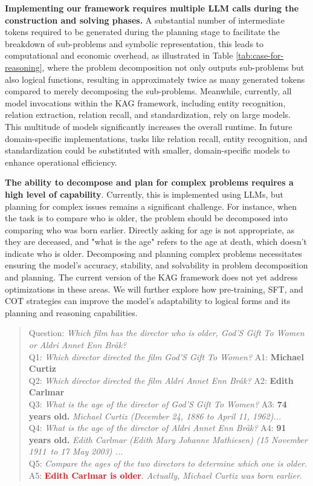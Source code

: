 \documentclass{article}
\begin{document}
\textbf{Implementing our framework requires multiple LLM calls during the construction and solving phases.} A substantial number of intermediate tokens required to be generated during the planning stage to facilitate the breakdown of sub-problems and symbolic representation, this leads to computational and economic overhead, as illustrated in Table \ref{tab:case-for-reasoning}, where the problem decomposition not only outputs sub-problems but also logical functions, resulting in approximately twice as many generated tokens compared to merely decomposing the sub-problems. Meanwhile, currently, all model invocations within the KAG framework, including entity recognition, relation extraction, relation recall, and standardization, rely on large models. This multitude of models significantly increases the overall runtime. In future domain-specific implementations, tasks like relation recall, entity recognition, and standardization could be substituted with smaller, domain-specific models to enhance operational efficiency.

\textbf{The ability to decompose and plan for complex problems requires a high level of capability}. Currently, this is implemented using LLMs, but planning for complex issues remains a significant challenge. For instance, when the task is to compare who is older, the problem should be decomposed into comparing who was born earlier. Directly asking for age is not appropriate, as they are deceased, and \text"what is the age" refers to the age at death, which doesn't indicate who is older. 
Decomposing and planning complex problems necessitates ensuring the model's accuracy, stability, and solvability in problem decomposition and planning. The current version of the KAG framework does not yet address optimizations in these areas.
We will further explore how pre-training, SFT, and COT strategies can improve the model's adaptability to logical forms and its planning and reasoning capabilities.

\begin{quote}
\small
    Question: \textit{Which film has the director who is older, God'S Gift To Women or Aldri Annet Enn Bråk?} \\
    Q1: \textit{Which director directed the film God'S Gift To Women?}  A1: \textbf{Michael Curtiz} \\
    Q2: \textit{Which director directed the film Aldri Annet Enn Bråk?}  A2: \textbf{Edith Carlmar} \\
    Q3: \textit{What is the age of the director of God'S Gift To Women? } A3: \textbf{74 years old.} \textit{Michael Curtiz (December 24, 1886 to April 11, 1962)...}\\
    Q4: \textit{What is the age of the director of Aldri Annet Enn Bråk?}  A4: \textbf{91 years old.} \textit{Edith Carlmar (Edith Mary Johanne Mathiesen)  (15 November 1911\ to 17 May 2003) ...}\\
    Q5: \textit{Compare the ages of the two directors to determine which one is older.}  A5: \textcolor{red}{\textbf{Edith Carlmar is older}.} \textit{Actually, Michael Curtiz was born earlier}.
\end{quote}
\end{document}
